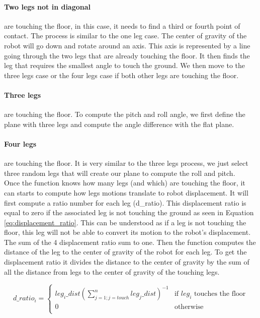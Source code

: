             \paragraph{Two legs not in diagonal} are touching the floor, in this case, it needs to find a third or fourth point of contact. The process is similar to the one leg case. The center of gravity of the robot will go down and rotate around an axis. This axis is represented by a line going through the two legs that are already touching the floor. It then finds the leg that requires the smallest angle to touch the ground. We then move to the three legs case or the four legs case if both other legs are touching the floor. 
            \paragraph{Three legs} are touching the floor. To compute the pitch and roll angle, we first define the plane with three legs and compute the angle difference with the flat plane. 
            \paragraph{Four legs} are touching the floor. It is very similar to the three legs process, we just select three random legs that will create our plane to compute the roll and pitch.
            \\
            
            Once the function knows how many legs (and which) are touching the floor, it can starts to compute how legs motions translate to robot displacement. It will first compute a ratio number for each leg (d\_ratio). This displacement ratio is equal to zero if the associated leg is not touching the ground as seen in Equation \ref{eq:displacement_ratio}. This can be understood as if a leg is not touching the floor, this leg will not be able to convert its motion to the robot's displacement. The sum of the 4 displacement ratio sum to one. Then the function computes the distance of the leg to the center of gravity of the robot for each leg. To get the displacement ratio it divides the distance to the center of gravity by the sum of all the distance from legs to the center of gravity of the touching legs.

            \begin{equation}
                d\_ratio_i = 
                \begin{cases}
                  leg_i\_dist \left(\sum_{j=1;j=touch}^{n}leg_j\_dist\right)^{-1} & \text{if $leg_i$ touches the floor}\\
                  0 & \text{otherwise}\\
                \end{cases}  
                \label{eq:displacement_ratio}
            \end{equation}
            
